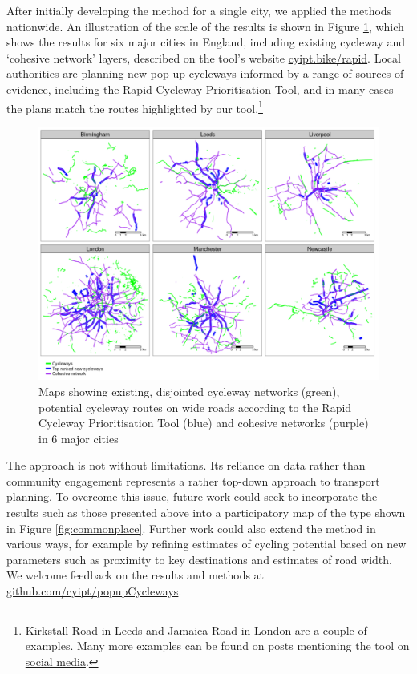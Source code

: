 \documentclass[
]{article}
\begin{document}
After initially developing the method for a single city, we applied the methods nationwide.
An illustration of the scale of the results is shown in Figure \ref{fig:facet}, which shows the results for six major cities in England, including existing cycleway and `cohesive network' layers, described on the tool's website \href{https://www.cyipt.bike/rapid/}{cyipt.bike/rapid}.
Local authorities are planning new pop-up cycleways informed by a range of sources of evidence, including the Rapid Cycleway Prioritisation Tool, and in many cases the plans match the routes highlighted by our tool.\footnote{
  \href{https://www.bbc.co.uk/news/uk-england-leeds-52577554}{Kirkstall Road} in Leeds and \href{https://www.se16.com/6208-work-starts-on-54m-cycleway-along-jamaica-road}{Jamaica Road} in London are a couple of examples.
  Many more examples can be found on posts mentioning the tool on \href{https://twitter.com/search?q=cyipt.bike\%2Frapid}{social media}.}

\begin{figure}
\includegraphics[width=1\linewidth]{figures/facet-output} \caption{Maps showing existing, disjointed cycleway networks (green), potential cycleway routes on wide roads according to the Rapid Cycleway Prioritisation Tool (blue) and cohesive networks (purple) in 6 major cities}\label{fig:facet}
\end{figure}

The approach is not without limitations.
Its reliance on data rather than community engagement represents a rather top-down approach to transport planning.
To overcome this issue, future work could seek to incorporate the results such as those presented above into a participatory map of the type shown in Figure \ref{fig:commonplace}.
Further work could also extend the method in various ways, for example by refining estimates of cycling potential based on new parameters such as proximity to key destinations and estimates of road width.
We welcome feedback on the results and methods at \href{https://github.com/cyipt/popupCycleways}{github.com/cyipt/popupCycleways}.
\end{document}

